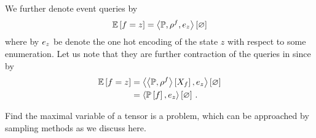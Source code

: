 We further denote event queries by
	\[  \mathbb{E}\left[f=z\right] = \left\langle \mathbb{P},\rho^{f},e_{z}\right\rangle \left[ \varnothing \right]\]
where by $e_{z}$ be denote the one hot encoding of the state $z$ with respect to some enumeration.
Let us note that they are further contraction of the queries in  since by 
\begin{align*}
	 \mathbb{E}\left[f=z\right] 
	& =  \left\langle  \left\langle \mathbb{P},\rho^{f}\right\rangle \left[ X_{f} \right] ,e_{z}\right\rangle \left[ \varnothing \right]\\
	& =  \left\langle  \mathbb{P}\left[f\right] ,e_{z}\right\rangle \left[ \varnothing \right] \, .
\end{align*}


%
%
%







Find the maximal variable of a tensor is a problem, which can be approached by sampling methods as we discuss here.

